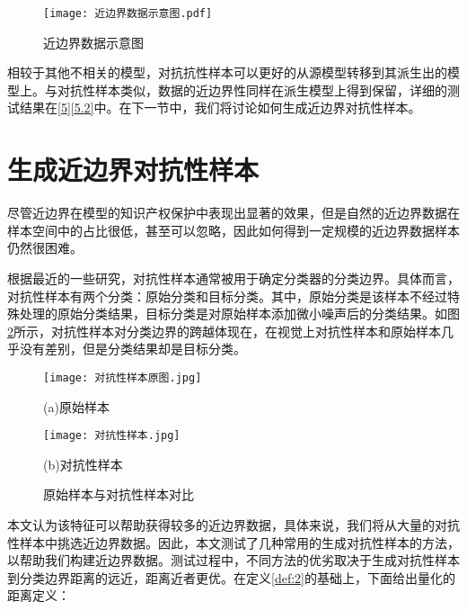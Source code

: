 \begin{figure}[htbp]%
	\centering
	\texttt{[image: 近边界数据示意图.pdf]}
	\setlength{\abovecaptionskip}{5mm} %
	\caption{近边界数据示意图}
	\label{近边界数据示意图}
	\end {figure}
	
相较于其他不相关的模型，对抗抗性样本可以更好的从源模型转移到其派生出的模型上。与对抗性样本类似，数据的近边界性同样在派生模型上得到保留，详细的测试结果在\ref{5}\ref{5.2}中。在下一节中，我们将讨论如何生成近边界对抗性样本。

\section{生成近边界对抗性样本}\label{3.2}

尽管近边界在模型的知识产权保护中表现出显著的效果，但是自然的近边界数据在样本空间中的占比很低，甚至可以忽略，因此如何得到一定规模的近边界数据样本仍然很困难。

根据最近的一些研究\cite{cao2021ipguard}，对抗性样本通常被用于确定分类器的分类边界。具体而言，对抗性样本有两个分类：原始分类和目标分类。其中，原始分类是该样本不经过特殊处理的原始分类结果，目标分类是对原始样本添加微小噪声后的分类结果。如图\ref{原始样本与对抗性样本对比}所示，对抗性样本对分类边界的跨越体现在，在视觉上对抗性样本和原始样本几乎没有差别，但是分类结果却是目标分类。

\begin{figure}[htbp]%
	\begin{minipage}[t]{0.49\linewidth}        %
		\hspace{2mm}
		\centering
		\texttt{[image: 对抗性样本原图.jpg]}
		\centerline{(a)原始样本}
	\end{minipage}
	\begin{minipage}[t]{0.49\linewidth}        %
		\hspace{2mm}
		\centering
		\texttt{[image: 对抗性样本.jpg]}
		\centerline{(b)对抗性样本}
	\end{minipage}
\setlength{\abovecaptionskip}{7mm} %
\caption{原始样本与对抗性样本对比}
\label{原始样本与对抗性样本对比}
\end {figure}


本文认为该特征可以帮助获得较多的近边界数据，具体来说，我们将从大量的对抗性样本中挑选近边界数据。因此，本文测试了几种常用的生成对抗性样本的方法，以帮助我们构建近边界数据。测试过程中，不同方法的优劣取决于生成对抗性样本到分类边界距离的远近，距离近者更优。在定义\ref{def:2}的基础上，下面给出量化的距离定义：


